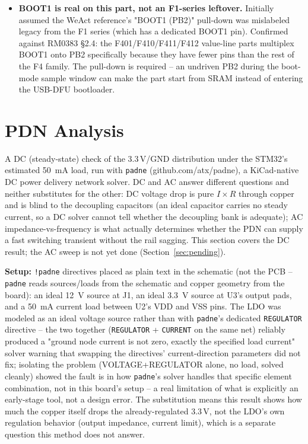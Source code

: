 \documentclass[11pt]{article}
\begin{document}
\begin{itemize}
  providing continuity between them -- DRC kept reporting them as unconnected until a track was
  explicitly drawn pad-to-pad across the component itself, which is correct behavior and not a bug.
\item \textbf{BOOT1 is real on this part, not an F1-series leftover.} Initially assumed the WeAct
  reference's "BOOT1 (PB2)" pull-down was mislabeled legacy from the F1 series (which has a dedicated
  BOOT1 pin). Confirmed against RM0383 \S2.4: the F401/F410/F411/F412 value-line parts multiplex
  BOOT1 onto PB2 specifically because they have fewer pins than the rest of the F4 family. The
  pull-down is required -- an undriven PB2 during the boot-mode sample window can make the part start
  from SRAM instead of entering the USB-DFU bootloader.
\end{itemize}

\section{PDN Analysis}
\label{sec:pdn}

A DC (steady-state) check of the 3.3\,V/GND distribution under the STM32's estimated
\SI{50}{\milli\ampere} load, run with \texttt{padne} (github.com/atx/padne), a KiCad-native DC power
delivery network solver. DC and AC answer different questions and neither substitutes for the other:
DC voltage drop is pure $I\times R$ through copper and is blind to the decoupling capacitors (an ideal
capacitor carries no steady current, so a DC solver cannot tell whether the decoupling bank is
adequate); AC impedance-vs-frequency is what actually determines whether the PDN can supply a fast
switching transient without the rail sagging. This section covers the DC result; the AC sweep is not
yet done (Section~\ref{sec:pending}).

\textbf{Setup:} \texttt{!padne} directives placed as plain text in the schematic (not the PCB --
\texttt{padne} reads sources/loads from the schematic and copper geometry from the board): an ideal
\SI{12}{\volt} source at J1, an ideal \SI{3.3}{\volt} source at U3's output pads, and a
\SI{50}{\milli\ampere} current load between U2's VDD and VSS pins. The LDO was modeled as an ideal
voltage source rather than with \texttt{padne}'s dedicated \texttt{REGULATOR} directive -- the two
together (\texttt{REGULATOR} + \texttt{CURRENT} on the same net) reliably produced a
"ground node current is not zero, exactly the specified load current" solver warning that swapping the
directives' current-direction parameters did not fix; isolating the problem (VOLTAGE+REGULATOR alone,
no load, solved cleanly) showed the fault is in how \texttt{padne}'s solver handles that specific
element combination, not in this board's setup -- a real limitation of what is explicitly an
early-stage tool, not a design error. The substitution means this result shows how much the copper
itself drops the already-regulated 3.3\,V, not the LDO's own regulation behavior (output impedance,
current limit), which is a separate question this method does not answer.
\end{document}
